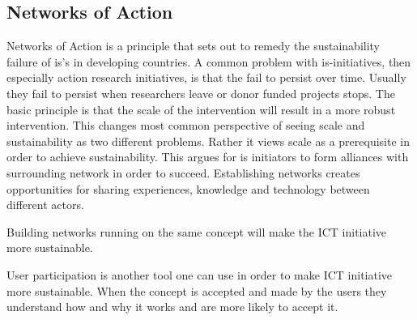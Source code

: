\cite{ca:isdc}


\subsection{Networks of Action}
Networks of Action is a principle that sets out to remedy the sustainability failure of \gls{is}'s in developing countries. 
A common problem with \gls{is}-initiatives, then especially action research initiatives, is that the fail to persist over time.
Usually they fail to persist when researchers leave or donor funded projects stops. 
The basic principle is that the scale of the intervention will result in a more robust intervention. 
This changes most common perspective of seeing scale and sustainability as two different problems. 
Rather it views scale as a prerequisite in order to achieve sustainability.
This argues for \gls{is} initiators to form alliances with surrounding network in order to succeed. 
Establishing networks creates opportunities for sharing experiences, knowledge  and technology between different actors. 

Building networks running on the same concept will make the ICT initiative more sustainable. 

User participation is another tool one can use in order to make ICT initiative more sustainable.
When the concept is accepted and made by the users they understand how and why it works and are more likely to accept it.

\cite{jbemss:noa}








